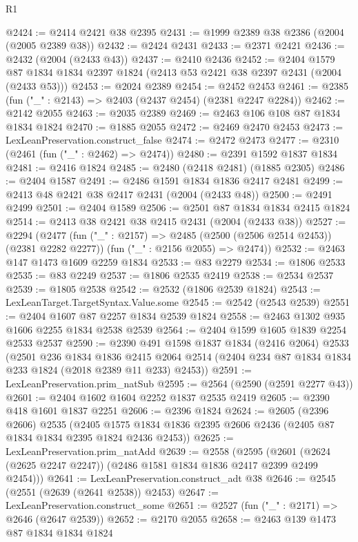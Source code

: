 \begin{lexlean}{R1}
\begin{coremodule}
@2424 := @2414 @2421 @38 @2395
@2431 := @1999 @2389 @38 @2386 (@2004 (@2005 @2389 @38))
@2432 := @2424 @2431
@2433 := @2371 @2421
@2436 := @2432 (@2004 (@2433 @43))
@2437 := @2410 @2436
@2452 := @2404
    @1579
    @87
    @1834
    @1834
    @2397
    @1824
    (@2413 @53 @2421 @38 @2397 @2431 (@2004 (@2433 @53)))
@2453 := @2024 @2389
@2454 := @2452 @2453
@2461 := @2385 (fun ("_" : @2143) => @2403 (@2437 @2454) (@2381 @2247 @2284))
@2462 := @2142 @2055
@2463 := @2035 @2389
@2469 := @2463 @106 @108 @87 @1834 @1834 @1824
@2470 := @1885 @2055
@2472 := @2469 @2470 @2453
@2473 := LexLeanPreservation.construct_false
@2474 := @2472 @2473
@2477 := @2310 (@2461 (fun ("_" : @2462) => @2474))
@2480 := @2391 @1592 @1837 @1834
@2481 := @2416 @1824
@2485 := @2480 (@2418 @2481) (@1885 @2305)
@2486 := @2404 @1587
@2491 := @2486 @1591 @1834 @1836 @2417 @2481
@2499 := @2413 @48 @2421 @38 @2417 @2431 (@2004 (@2433 @48))
@2500 := @2491 @2499
@2501 := @2404 @1589
@2506 := @2501 @87 @1834 @1834 @2415 @1824
@2514 := @2413 @38 @2421 @38 @2415 @2431 (@2004 (@2433 @38))
@2527 := @2294
    (@2477
      (fun ("_" : @2157) => @2485 (@2500 (@2506 @2514 @2453)) (@2381 @2282 @2277))
      (fun ("_" : @2156 @2055) => @2474))
@2532 := @2463 @147 @1473 @1609 @2259 @1834
@2533 := @83 @2279
@2534 := @1806 @2533
@2535 := @83 @2249
@2537 := @1806 @2535 @2419
@2538 := @2534 @2537
@2539 := @1805 @2538
@2542 := @2532 (@1806 @2539 @1824)
@2543 := LexLeanTarget.TargetSyntax.Value.some
@2545 := @2542 (@2543 @2539)
@2551 := @2404 @1607 @87 @2257 @1834 @2539 @1824
@2558 := @2463 @1302 @935 @1606 @2255 @1834 @2538 @2539
@2564 := @2404 @1599 @1605 @1839 @2254 @2533 @2537
@2590 := @2390
    @491
    @1598
    @1837
    @1834
    (@2416 @2064)
    @2533
    (@2501
      @236
      @1834
      @1836
      @2415
      @2064
      @2514
      (@2404 @234 @87 @1834 @1834 @233 @1824 (@2018 @2389 @11 @233) @2453))
@2591 := LexLeanPreservation.prim_natSub
@2595 := @2564 (@2590 (@2591 @2277 @43))
@2601 := @2404 @1602 @1604 @2252 @1837 @2535 @2419
@2605 := @2390 @418 @1601 @1837 @2251
@2606 := @2396 @1824
@2624 := @2605
    (@2396 @2606)
    @2535
    (@2405 @1575 @1834 @1836 @2395 @2606 @2436 (@2405 @87 @1834 @1834 @2395 @1824 @2436 @2453))
@2625 := LexLeanPreservation.prim_natAdd
@2639 := @2558
    (@2595 (@2601 (@2624 (@2625 @2247 @2247)) (@2486 @1581 @1834 @1836 @2417 @2399 @2499 @2454)))
@2641 := LexLeanPreservation.construct_adt @38
@2646 := @2545 (@2551 (@2639 (@2641 @2538)) @2453)
@2647 := LexLeanPreservation.construct_some
@2651 := @2527 (fun ("_" : @2171) => @2646 (@2647 @2539))
@2652 := @2170 @2055
@2658 := @2463 @139 @1473 @87 @1834 @1834 @1824

\end{coremodule}
\end{lexlean}
